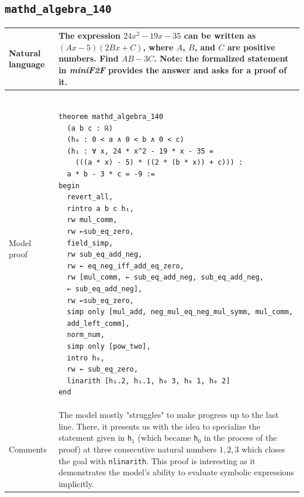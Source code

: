 \documentclass[nohyperref]{article}
\theoremstyle{plain}
\theoremstyle{definition}
\theoremstyle{remark}
\begin{document}
\subsection*{\texttt{mathd\_algebra\_140}} \label{exprob5}
\begin{table}[h]
\begin{small}
\begin{tabular}{|p{3.5cm}|p{12.5cm}|} 
  \hline 
  Natural language & 
  \begin{minipage}{12.5 cm}
    \vspace{0.5em} The expression $24x^2-19x-35$ can be written as $(Ax-5)(2Bx+C)$, where $A$, $B$, and $C$ are positive numbers. Find $AB-3C$. \textbf{Note}: the formalized statement in \textit{miniF2F} provides the answer and asks for a proof of it.
  \end{minipage} \\
  \hline 
  \centering Model proof & 
  \begin{minipage}{12.5 cm}
    \begin{verbatim} 
  
theorem mathd_algebra_140
  (a b c : ℝ)
  (h₀ : 0 < a ∧ 0 < b ∧ 0 < c)
  (h₁ : ∀ x, 24 * x^2 - 19 * x - 35 = 
    (((a * x) - 5) * ((2 * (b * x)) + c))) :
  a * b - 3 * c = -9 :=
begin
  revert_all,
  rintro a b c h₁,
  rw mul_comm,
  rw ←sub_eq_zero,
  field_simp,
  rw sub_eq_add_neg,
  rw ← eq_neg_iff_add_eq_zero,
  rw [mul_comm, ← sub_eq_add_neg, sub_eq_add_neg,
  ← sub_eq_add_neg],
  rw ←sub_eq_zero,
  simp only [mul_add, neg_mul_eq_neg_mul_symm, mul_comm,
  add_left_comm],
  norm_num,
  simp only [pow_two],
  intro h₀,
  rw ← sub_eq_zero,
  linarith [h₁.2, h₁.1, h₀ 3, h₀ 1, h₀ 2]
end
    \end{verbatim} 
  \end{minipage}\\\hline 
  \centering Comments & The model mostly "struggles" to make progress up to the last line. There, it presents us with the idea to specialize the statement given in \texttt{h$_1$} (which became \texttt{h$_0$} in the process of the proof) at three consecutive natural numbers $1, 2, 3$ which closes the goal with \texttt{nlinarith}. This proof is interesting as it demonstrates the model's ability to evaluate symbolic expressions implicitly. \\
  \hline
\end{tabular}
\end{small}
\end{table}

\newpage
\end{document}
